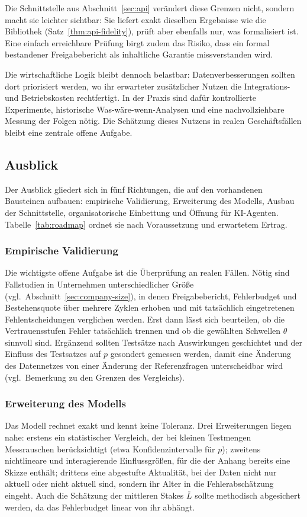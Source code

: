 \documentclass[a4paper,12pt]{article}
\theoremstyle{definition}
\begin{document}
Die Schnittstelle aus Abschnitt~\ref{sec:api} verändert diese Grenzen nicht, sondern macht sie leichter sichtbar: Sie liefert exakt dieselben Ergebnisse wie die Bibliothek (Satz~\ref{thm:api-fidelity}), prüft aber ebenfalls nur, was formalisiert ist. Eine einfach erreichbare Prüfung birgt zudem das Risiko, dass ein formal bestandener Freigabebericht als inhaltliche Garantie missverstanden wird.

Die wirtschaftliche Logik bleibt dennoch belastbar: Datenverbesserungen sollten dort priorisiert werden, wo ihr erwarteter zusätzlicher Nutzen die Integrations- und Betriebskosten rechtfertigt. In der Praxis sind dafür kontrollierte Experimente, historische Was-wäre-wenn-Analysen und eine nachvollziehbare Messung der Folgen nötig. Die Schätzung dieses Nutzens in realen Geschäftsfällen bleibt eine zentrale offene Aufgabe.

\subsection{Ausblick}\label{sec:outlook}
Der Ausblick gliedert sich in fünf Richtungen, die auf den vorhandenen Bausteinen aufbauen: empirische Validierung, Erweiterung des Modells, Ausbau der Schnittstelle, organisatorische Einbettung und Öffnung für KI-Agenten. Tabelle~\ref{tab:roadmap} ordnet sie nach Voraussetzung und erwartetem Ertrag.

\subsubsection{Empirische Validierung}
Die wichtigste offene Aufgabe ist die Überprüfung an realen Fällen. Nötig sind Fallstudien in Unternehmen unterschiedlicher Größe (vgl.\ Abschnitt~\ref{sec:company-size}), in denen Freigabebericht, Fehlerbudget und Bestehensquote über mehrere Zyklen erhoben und mit tatsächlich eingetretenen Fehlentscheidungen verglichen werden. Erst dann lässt sich beurteilen, ob die Vertrauensstufen Fehler tatsächlich trennen und ob die gewählten Schwellen $\theta$ sinnvoll sind. Ergänzend sollten Testsätze nach Auswirkungen geschichtet und der Einfluss des Testsatzes auf $p$ gesondert gemessen werden, damit eine Änderung des Datennetzes von einer Änderung der Referenzfragen unterscheidbar wird (vgl.\ Bemerkung zu den Grenzen des Vergleichs).

\subsubsection{Erweiterung des Modells}
Das Modell rechnet exakt und kennt keine Toleranz. Drei Erweiterungen liegen nahe: erstens ein statistischer Vergleich, der bei kleinen Testmengen Messrauschen berücksichtigt (etwa Konfidenzintervalle für $p$); zweitens nichtlineare und interagierende Einflussgrößen, für die der Anhang bereits eine Skizze enthält; drittens eine abgestufte Aktualität, bei der Daten nicht nur aktuell oder nicht aktuell sind, sondern ihr Alter in die Fehlerabschätzung eingeht. Auch die Schätzung der mittleren Stakes $\bar L$ sollte methodisch abgesichert werden, da das Fehlerbudget linear von ihr abhängt.
\end{document}
